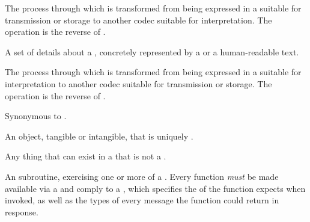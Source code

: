 {
The process through which  is transformed from being expressed in a  suitable for transmission or storage to another codec suitable for interpretation.
The operation is the reverse of .

A set of details about a , concretely represented by a  or a human-readable text.




The process through which  is transformed from being expressed in a  suitable for interpretation to another codec suitable for transmission or storage.
The operation is the reverse of .

Synonymous to .

An object, tangible or intangible, that is uniquely .


Any thing that can exist in a  that is not a .


An  subroutine, exercising one or more  of a  .
Every function \textit{must} be made available via a  and comply to a , which specifies the  of  the function expects when invoked, as well as the types of every message the function could return in response.

}
